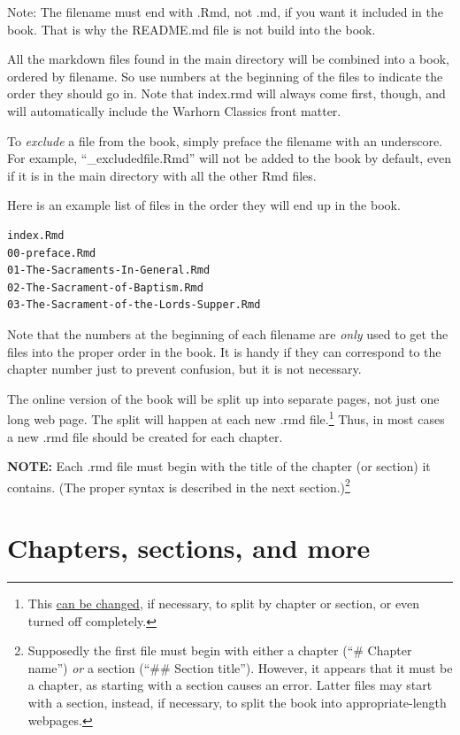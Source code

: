 \documentclass[
]{book}
\begin{document}
Note: The filename must end with .Rmd, not .md, if you want it included in the book. That is why the README.md file is not build into the book.

All the markdown files found in the main directory will be combined into a book, ordered by filename. So use numbers at the beginning of the files to indicate the order they should go in. Note that index.rmd will always come first, though, and will automatically include the Warhorn Classics front matter.

To \emph{exclude} a file from the book, simply preface the filename with an underscore. For example, ``\_excludedfile.Rmd'' will not be added to the book by default, even if it is in the main directory with all the other Rmd files.

Here is an example list of files in the order they will end up in the book.

\begin{verbatim}
index.Rmd
00-preface.Rmd
01-The-Sacraments-In-General.Rmd
02-The-Sacrament-of-Baptism.Rmd
03-The-Sacrament-of-the-Lords-Supper.Rmd
\end{verbatim}

Note that the numbers at the beginning of each filename are \emph{only} used to get the files into the proper order in the book. It is handy if they can correspond to the chapter number just to prevent confusion, but it is not necessary.

The online version of the book will be split up into separate pages, not just one long web page. The split will happen at each new .rmd file.\footnote{This \href{https://bookdown.org/yihui/bookdown/html.html\#gitbook-style}{can be changed}, if necessary, to split by chapter or section, or even turned off completely.} Thus, in most cases a new .rmd file should be created for each chapter.

\textbf{NOTE:} Each .rmd file must begin with the title of the chapter (or section) it contains. (The proper syntax is described in the next section.)\footnote{Supposedly the first file must begin with either a chapter (``\# Chapter name'') \emph{or} a section (``\#\# Section title''). However, it appears that it must be a chapter, as starting with a section causes an error. Latter files may start with a section, instead, if necessary, to split the book into appropriate-length webpages.}

\hypertarget{chapters-sections-and-more}{%
\section{Chapters, sections, and more}\label{chapters-sections-and-more}}
\end{document}
